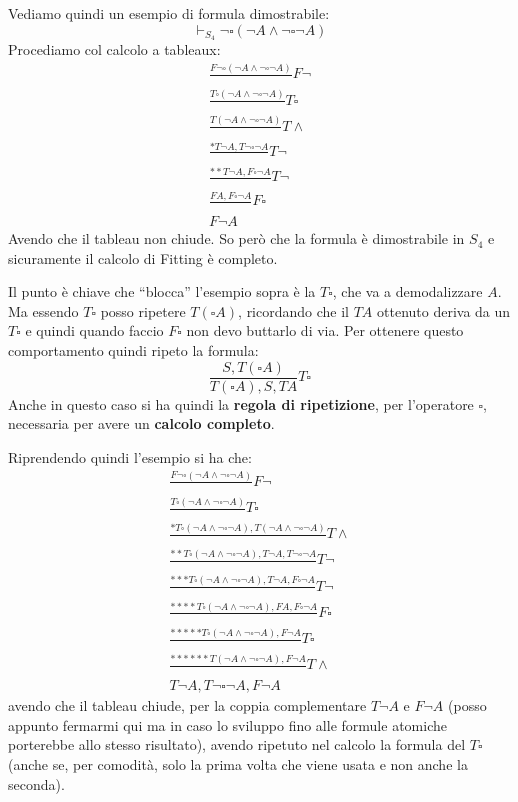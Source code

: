 \documentclass[a4paper,12pt, oneside]{book}
\begin{document}
\begin{esempio}
  Vediamo quindi un esempio di formula dimostrabile:
  \[\vdash_{S_4}\neg\square(\neg A\land \neg \square\neg A)\]
  Procediamo col calcolo a tableaux:
  \begin{gather*}
    \frac{F\neg\square(\neg A\land \neg \square\neg A)}{}F\neg\\
    \frac{T\square(\neg A\land \neg \square\neg A)}{}T\square\\
    \frac{T(\neg A\land \neg \square\neg A)}{}T\land\\
    \frac{*T\neg A, T\neg\square\neg A}{}T\neg\\
    \frac{**T\neg A, F\square\neg A}{}T\neg\\
    \frac{FA,F\square\neg A}{}F\square\\
    F\neg A
  \end{gather*}
  Avendo che il tableau non chiude. So però che la formula è dimostrabile in
  $S_4$ e sicuramente il calcolo di Fitting è completo.
\end{esempio}
Il punto è chiave che ``blocca'' l'esempio sopra è la $T\square$, che va a
demodalizzare $A$. Ma essendo 
$T\square$ posso ripetere $T(\square A)$, ricordando che il $TA$ ottenuto
deriva da un $T\square$  e quindi quando faccio $F\square$ non devo buttarlo
di via. Per ottenere questo comportamento quindi ripeto la formula:
\[\frac{S,T(\square A)}{T(\square A),S,TA}T\square\]
Anche in questo caso si ha quindi la \textbf{regola di ripetizione}, per
l'operatore $\square$, necessaria per avere un \textbf{calcolo completo}.
\begin{esempio}
  Riprendendo quindi l'esempio si ha che:
  \begin{gather*}
    \frac{F\neg\square(\neg A\land \neg \square\neg A)}{}F\neg\\
    \frac{T\square(\neg A\land \neg \square\neg A)}{}T\square\\
    \frac{*T\square(\neg A\land \neg \square\neg A),
    T(\neg A\land \neg \square\neg A)}{}T\land\\
    \frac{**T\square(\neg A\land \neg \square\neg A),
    T\neg A, T\neg\square\neg A}{}T\neg\\
    \frac{***T\square(\neg A\land \neg \square\neg A),
    T\neg A, F\square\neg A}{}T\neg\\
    \frac{****T\square(\neg A\land \neg \square\neg A),
    FA,F\square\neg A}{}F\square\\
    \frac{*****T\square(\neg A\land \neg \square\neg A), F\neg A}{}T\square\\
    \frac{******T(\neg A\land \neg \square\neg A), F\neg A}{}T\land\\
    T\neg A, T\neg\square\neg A, F\neg A
  \end{gather*}
  avendo che il tableau chiude, per la coppia complementare $T\neg A$ e
  $F\neg A$ (posso appunto fermarmi qui ma in caso lo sviluppo fino alle formule
  atomiche porterebbe allo stesso risultato), avendo ripetuto nel calcolo la
  formula del $T\square$ (anche se, per comodità, solo la prima volta che viene
  usata e non anche la seconda). 
\end{esempio}
\end{document}
